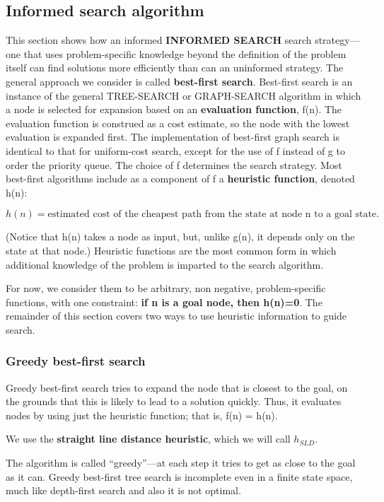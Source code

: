 \subsection{Informed search algorithm}
This section shows how an informed \textbf{INFORMED SEARCH} search strategy—one that uses problem-specific knowledge beyond the definition of the problem itself can find solutions more efficiently than can an uninformed strategy.
The general approach we consider is called \textbf{best-first search}. Best-first search is an instance of the general TREE-SEARCH or GRAPH-SEARCH algorithm in which a node is selected for expansion based on an \textbf{evaluation function}, f(n). The evaluation function is construed as a cost estimate, so the node with the lowest evaluation is expanded first. The implementation of best-first graph search is identical to that for uniform-cost search, except for the use of f instead of g to order the priority queue.
The choice of f determines the search strategy. Most best-first algorithms include as a component of f a \textbf{heuristic function}, denoted h(n):

\[h(n) = \text{estimated cost of the cheapest path from the state at node n to a goal state.}\]

(Notice that h(n) takes a node as input, but, unlike g(n), it depends only on the state at that node.)
Heuristic functions are the most common form in which additional knowledge of the problem is imparted to the search algorithm.

For now, we consider them to be arbitrary, non negative, problem-specific functions, with one constraint: \textbf{if n is a goal node, then h(n)=0}. The remainder of this section covers two ways to use heuristic information to guide search.

\subsubsection{Greedy best-first search}
Greedy best-first search tries to expand the node that is closest to the goal, on the grounds that this is likely to lead to a solution quickly. Thus, it evaluates nodes by using just the heuristic function; that is, f(n) = h(n).

We use the \textbf{straight line distance heuristic}, which we will call $h_{SLD}$.

The algorithm is called “greedy”—at each step it tries to get as close to the goal as it can.
Greedy best-first tree search is incomplete even in a finite state space, much like depth-first search and also it is not optimal.
